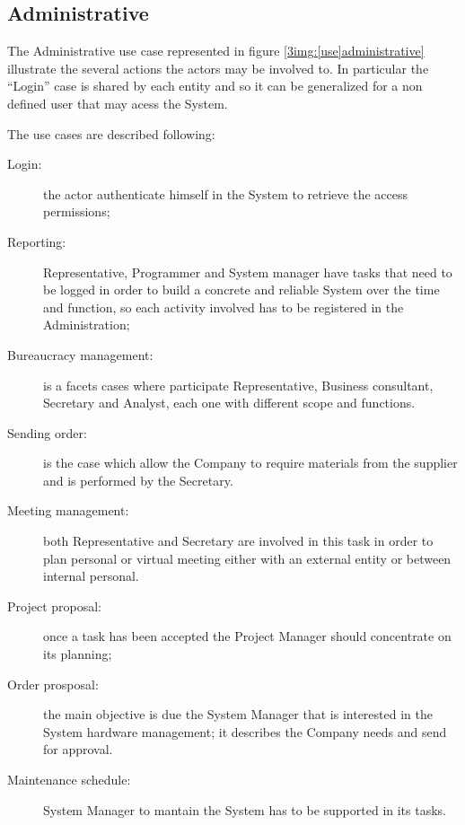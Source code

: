 \subsection{Administrative}
The Administrative use case represented in figure \ref{3img:[use]administrative} illustrate the several actions the actors may be involved to. In particular the ``Login'' case is shared by each entity and so it can be generalized for a non defined user that may acess the System.

The use cases are described following:
\begin{description}
\item[Login:] the actor authenticate himself in the System to retrieve the access permissions;
\item[Reporting:] Representative, Programmer and System manager have tasks that need to be logged in order to build a concrete and reliable System over the time and function, so each activity involved has to be registered in the Administration;
\item[Bureaucracy management:] is a facets cases where participate Representative, Business consultant, Secretary and Analyst, each one with different scope and functions.
\item[Sending order:] is the case which allow the Company to require materials from the supplier and is performed by the Secretary.
\item[Meeting management:] both Representative and Secretary are involved in this task in order to plan personal or virtual meeting either with an external entity or between internal personal.
\item[Project proposal:] once a task has been accepted the Project Manager should concentrate on its planning;
\item[Order prosposal:] the main objective is due the System Manager that is interested in the System hardware management; it describes the Company needs and send for approval.
\item[Maintenance schedule:] System Manager to mantain the System has to be supported in its tasks.
\end{description}



